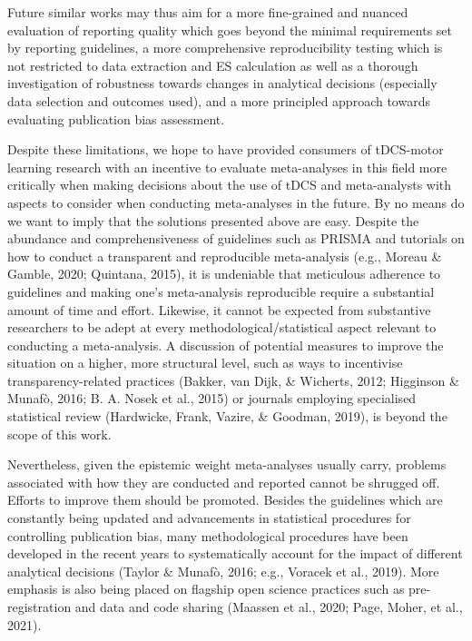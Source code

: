 \documentclass[
  man,floatsintext]{apa6}
\begin{document}
Future similar works may thus aim for a more fine-grained and nuanced evaluation of reporting quality which goes beyond the minimal requirements set by reporting guidelines, a more comprehensive reproducibility testing which is not restricted to data extraction and ES calculation as well as a thorough investigation of robustness towards changes in analytical decisions (especially data selection and outcomes used), and a more principled approach towards evaluating publication bias assessment.

Despite these limitations, we hope to have provided consumers of tDCS-motor learning research with an incentive to evaluate meta-analyses in this field more critically when making decisions about the use of tDCS and meta-analysts with aspects to consider when conducting meta-analyses in the future. By no means do we want to imply that the solutions presented above are easy. Despite the abundance and comprehensiveness of guidelines such as PRISMA and tutorials on how to conduct a transparent and reproducible meta-analysis (e.g., Moreau \& Gamble, 2020; Quintana, 2015), it is undeniable that meticulous adherence to guidelines and making one's meta-analysis reproducible require a substantial amount of time and effort. Likewise, it cannot be expected from substantive researchers to be adept at every methodological/statistical aspect relevant to conducting a meta-analysis. A discussion of potential measures to improve the situation on a higher, more structural level, such as ways to incentivise transparency-related practices (Bakker, van Dijk, \& Wicherts, 2012; Higginson \& Munafò, 2016; B. A. Nosek et al., 2015) or journals employing specialised statistical review (Hardwicke, Frank, Vazire, \& Goodman, 2019), is beyond the scope of this work.

Nevertheless, given the epistemic weight meta-analyses usually carry, problems associated with how they are conducted and reported cannot be shrugged off. Efforts to improve them should be promoted. Besides the guidelines which are constantly being updated and advancements in statistical procedures for controlling publication bias, many methodological procedures have been developed in the recent years to systematically account for the impact of different analytical decisions (Taylor \& Munafò, 2016; e.g., Voracek et al., 2019). More emphasis is also being placed on flagship open science practices such as pre-registration and data and code sharing (Maassen et al., 2020; Page, Moher, et al., 2021).
\end{document}
